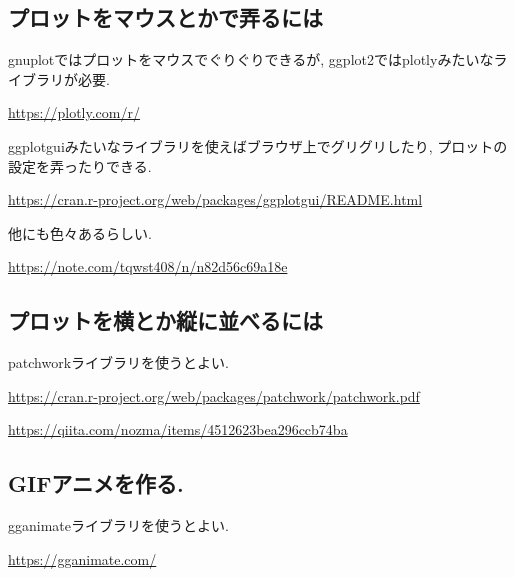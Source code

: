 \documentclass[lualatex,a4paper,12pt,report,ja=standard]{bxjsarticle}
\begin{document}
\subsection{プロットをマウスとかで弄るには}
\label{sec:orga72beeb}
gnuplotではプロットをマウスでぐりぐりできるが, ggplot2ではplotlyみたいなライブラリが必要.

\url{https://plotly.com/r/}

ggplotguiみたいなライブラリを使えばブラウザ上でグリグリしたり, プロットの設定を弄ったりできる.

\url{https://cran.r-project.org/web/packages/ggplotgui/README.html}

他にも色々あるらしい.

\url{https://note.com/tqwst408/n/n82d56c69a18e}
\subsection{プロットを横とか縦に並べるには}
\label{sec:org021769c}
patchworkライブラリを使うとよい.

\url{https://cran.r-project.org/web/packages/patchwork/patchwork.pdf}

\url{https://qiita.com/nozma/items/4512623bea296ccb74ba}
\subsection{GIFアニメを作る.}
\label{sec:org00b8c76}
gganimateライブラリを使うとよい.

\url{https://gganimate.com/}
\end{document}
